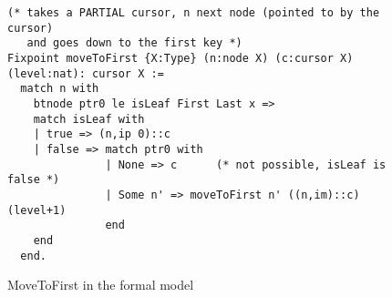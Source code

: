 \begin{figure}
\begin{lstlisting}[language=Coq]
(* takes a PARTIAL cursor, n next node (pointed to by the cursor)
   and goes down to the first key *)
Fixpoint moveToFirst {X:Type} (n:node X) (c:cursor X) (level:nat): cursor X :=
  match n with
    btnode ptr0 le isLeaf First Last x =>
    match isLeaf with
    | true => (n,ip 0)::c
    | false => match ptr0 with
               | None => c      (* not possible, isLeaf is false *)
               | Some n' => moveToFirst n' ((n,im)::c) (level+1)
               end
    end
  end.
\end{lstlisting}
\caption{MoveToFirst in the formal model}
\label{movetofirst}
\end{figure}  
